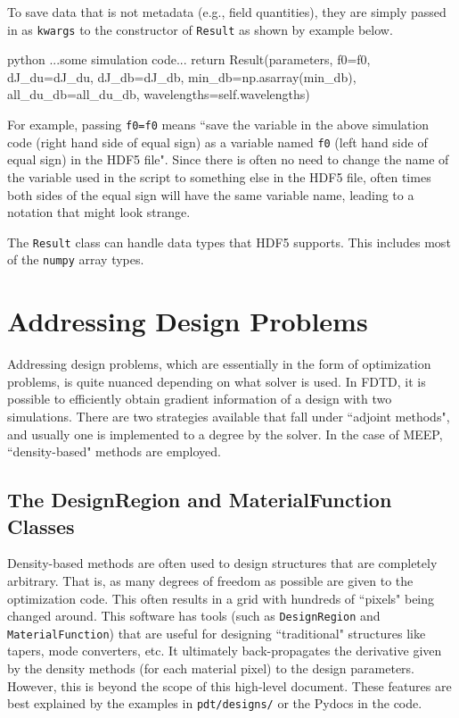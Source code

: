 \documentclass[12pt]{article}
\begin{document}
To save data that is not metadata (e.g., field quantities), they are simply passed in as \texttt{kwargs} to the constructor of \texttt{Result} as shown by example below.
\begin{mintedbox}{python}
	...some simulation code...
	return Result(parameters, f0=f0, dJ_du=dJ_du, dJ_db=dJ_db, min_db=np.asarray(min_db), all_du_db=all_du_db, wavelengths=self.wavelengths)
\end{mintedbox}

For example, passing \texttt{f0=f0} means ``save the variable in the above simulation code (right hand side of equal sign) as a variable named \texttt{f0} (left hand side of equal sign) in the HDF5 file". Since there is often no need to change the name of the variable used in the script to something else in the HDF5 file, often times both sides of the equal sign will have the same variable name, leading to a notation that might look strange.

The \texttt{Result} class can handle data types that HDF5 supports. This includes most of the \texttt{numpy} array types.

\section{Addressing Design Problems}
Addressing design problems, which are essentially in the form of optimization problems, is quite nuanced depending on what solver is used. In FDTD, it is possible to efficiently obtain gradient information of a design with two simulations. There are two strategies available that fall under ``adjoint methods", and usually one is implemented to a degree by the solver. In the case of MEEP, ``density-based" methods are employed. 

\subsection{The DesignRegion and MaterialFunction Classes}

Density-based methods are often used to design structures that are completely arbitrary. That is, as many degrees of freedom as possible are given to the optimization code. This often results in a grid with hundreds of ``pixels" being changed around. This software has tools (such as \texttt{DesignRegion} and \texttt{MaterialFunction}) that are useful for designing ``traditional" structures like tapers, mode converters, etc. It ultimately back-propagates the derivative given by the density methods (for each material pixel) to the design parameters. However, this is beyond the scope of this high-level document. These features are best explained by the examples in \texttt{pdt/designs/} or the Pydocs in the code.
\end{document}
